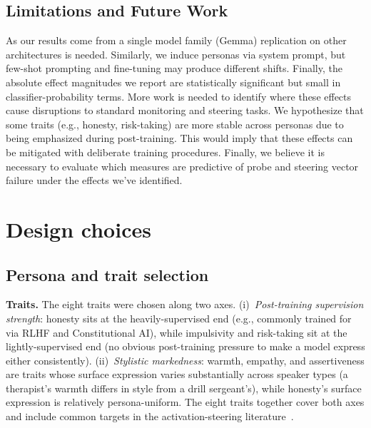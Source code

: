 \documentclass{article}
\theoremstyle{plain}
\theoremstyle{definition}
\theoremstyle{remark}
\begin{document}
\subsection{Limitations and Future Work}
\label{sec:limitations}

As our results come from a single model family (Gemma) replication on other architectures is needed. Similarly, we induce personas via system prompt, but few-shot prompting and fine-tuning may produce different shifts. Finally, the absolute effect magnitudes we report are statistically significant but small in classifier-probability terms. More work is needed to identify where these effects cause disruptions to standard monitoring and steering tasks.
We hypothesize that some traits (e.g., honesty, risk-taking) are more stable across personas due to being emphasized during post-training. This would imply that these effects can be mitigated with deliberate training procedures. Finally, we believe it is necessary to evaluate which measures are predictive of probe and steering vector failure under the effects we've identified. 




 

\onecolumn
\appendix

\section{Design choices}

\subsection{Persona and trait selection}
\label{app:persona-trait-choice}

\textbf{Traits.} The eight traits were chosen along two axes. (i)~\emph{Post-training supervision strength}: honesty sits at the heavily-supervised end (e.g., commonly trained for via RLHF and Constitutional AI), while impulsivity and risk-taking sit at the lightly-supervised end (no obvious post-training pressure to make a model express either consistently). (ii)~\emph{Stylistic markedness}: warmth, empathy, and assertiveness are traits whose surface expression varies substantially across speaker types (a therapist's warmth differs in style from a drill sergeant's), while honesty's surface expression is relatively persona-uniform. The eight traits together cover both axes and include common targets in the activation-steering literature~\citep{rimsky2024steering, chen2025persona}.
\end{document}
